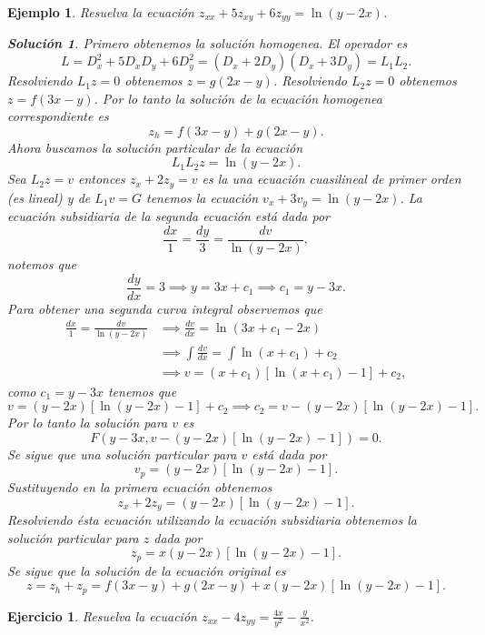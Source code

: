 \documentclass[11pt,letterpaper,draft]{report}
\newtheorem{example}[defn]{Ejemplo}
\newtheorem{exe}[defn]{Ejercicio}
\newtheorem*{sol}{Solución}
\newcommand\<{\langle}
\renewcommand\>{\rangle}
\begin{document}
\begin{example}
  Resuelva la ecuación $z_{xx} + 5z_{xy} + 6z_{yy} =
  \ln(y-2x)$.
  \begin{sol}
    Primero obtenemos la solución homogenea. El operador es
    \[
    L = D_x^2 + 5D_xD_y + 6D_y^2 = (D_x+2D_y)(D_x+3D_y) =
    L_1L_2.
    \] 
    Resolviendo $L_1z=0$ obtenemos $z = g(2x-y)$.
    Resolviendo $L_2z=0$ obtenemos $z = f(3x-y)$. Por lo
    tanto la solución de la ecuación homogenea
    correspondiente es
    \[
    z_h = f(3x-y) + g(2x-y).
    \] 
    Ahora buscamos la solución particular de la ecuación
    \[
    L_1L_2z = \ln(y-2x).
    \] 
    Sea $L_2z = v$ entonces $z_x + 2z_y = v$ es la una
    ecuación cuasilineal de primer orden (es lineal) y de
    $L_1v = G$ tenemos la ecuación $v_x + 3v_y = \ln(y-2x)$.
    La ecuación subsidiaria de la segunda ecuación está dada
    por
    \[
    \frac{dx}{1} = \frac{dy}{3} = \frac{dv}{\ln(y-2x)},
    \] 
    notemos que
    \[
    \frac{dy}{dx} = 3 \implies y = 3x + c_1 \implies c_1 = y
    - 3x.
    \] 
    Para obtener una segunda curva integral observemos que
    \begin{align*}
      \frac{dx}{1} = \frac{dv}{\ln(y-2x)}
      &\implies
      \frac{dv}{dx} = \ln(3x+c_1-2x)\\
      &\implies \int \frac{dv}{dx} = \int \ln(x+c_1) + c_2\\
      &\implies v = (x+c_1)[\ln(x+c_1)-1] + c_2,
    \end{align*}
    como $c_1 = y - 3x$ tenemos que
    \[
    v = (y-2x)[\ln(y-2x)-1] + c_2 \implies c_2 = v -
    (y-2x)[\ln(y-2x)-1].
    \] 
    Por lo tanto la solución para $v$ es
    \[
    F(y-3x, v-(y-2x)[\ln(y-2x)-1]) = 0.
    \] 
    Se sigue que una solución particular para $v$ está dada
    por
    \[
    v_p = (y-2x)[\ln(y-2x)-1].
    \] 
    Sustituyendo en la primera ecuación obtenemos
    \[
    z_x + 2z_y = (y-2x)[\ln(y-2x)-1].
    \] 
    Resolviendo ésta ecuación utilizando la ecuación
    subsidiaria obtenemos la solución particular para $z$ 
    dada por
    \[
    z_p = x(y-2x)[\ln(y-2x)-1].
    \] 
    Se sigue que la solución de la ecuación original es
    \[
    z = z_h + z_p = f(3x-y) + g(2x-y) +
    x(y-2x)[\ln(y-2x)-1].
    \] 
  \end{sol}
\end{example}

\begin{exe}
  Resuelva la ecuación $\displaystyle z_{xx} - 4z_{yy} = \frac{4x}{y^2} -
  \frac{y}{x^2}$.
\end{exe}
\end{document}
